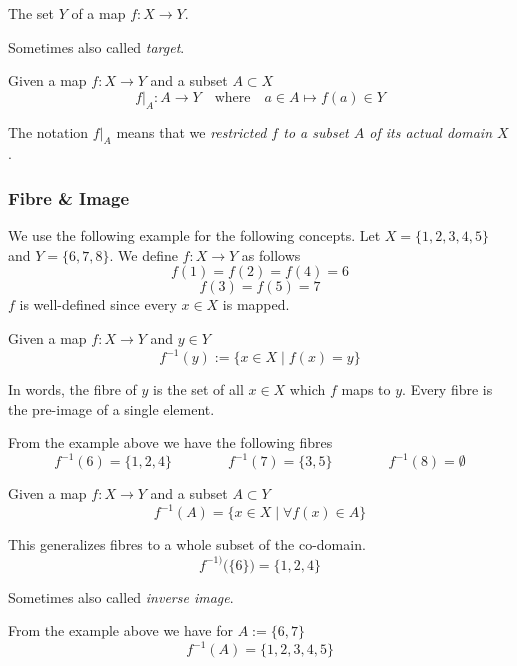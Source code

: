 \begin{definition}\label{def:codomain}
   The set \(Y\) of a map \(f: X \to Y\).
\end{definition}
\begin{remark}[Terminology]
   Sometimes also called \emph{target}.
\end{remark}

\begin{definition}
   Given a map \(f: X \to Y\) and a subset \(A \subset X\)
   \[f|_A: A \to Y \quad\text{where}\quad a \in A \mapsto f(a) \in Y\]
\end{definition}
\begin{remark}[Intuition]
   The notation \(f|_A\) means that we \emph{restricted \(f\) to a subset \(A\) of its actual domain \(X\)}.
\end{remark}

\subsubsection{Fibre \& Image}
We use the following example for the following concepts.
Let \(X = \{1, 2, 3, 4, 5\}\) and \(Y = \{6, 7, 8\}\).
We define \(f: X \to Y\) as follows
\[f(1) = f(2) = f(4) = 6\]
\[f(3) = f(5) = 7\]
\(f\) is well-defined since every \(x \in X\) is mapped.

\begin{definition}
   Given a map \(f: X \to Y\) and \(y \in Y\)
   \[f^{-1}(y) := \{x \in X \mid f(x) = y\}\]
\end{definition}
\begin{remark}[Intuition]
   In words, the fibre of \(y\) is the set of all \(x \in X\) which \(f\) maps to \(y\).
   Every fibre is the pre-image of a single element.
\end{remark}
\begin{example}
   From the example above we have the following fibres
   \[f^{-1}(6) = \{1, 2, 4\} \qquad\qquad f^{-1}(7) = \{3,5\} \qquad\qquad f^{-1}(8) = \emptyset\]
\end{example}

\begin{definition}\label{def:pre-image}
   Given a map \(f: X \to Y\) and a subset \(A \subset Y\)
   \[f^{-1}(A) = \{x \in X \mid \forall f(x) \in A\}\]
\end{definition}
\begin{remark}[Intuition]
   This generalizes fibres to a whole subset of the co-domain.
   \[f^{-1)}\big(\{6\}\big) = \{1, 2, 4\}\]
\end{remark}
\begin{remark}[Terminology]
   Sometimes also called \emph{inverse image}.
\end{remark}
\begin{example}
   From the example above we have for \(A := \{6,7\}\)
   \[f^{-1}(A) = \{1,2,3,4,5\}\]
\end{example}

